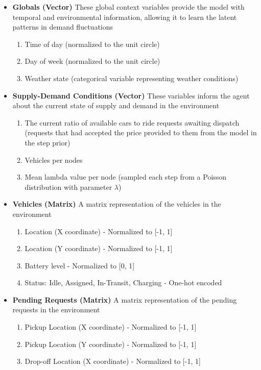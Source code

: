 \documentclass[11pt]{article}
\begin{document}
\begin{itemize}
		\item \textbf{Globals (Vector)} These global context variables provide the model with temporal and
				environmental information, allowing it to learn the latent patterns in demand fluctuations
				\begin{enumerate}
						\item Time of day (normalized to the unit circle)
						\item Day of week (normalized to the unit circle)
						\item Weather state (categorical variable representing weather conditions)
				\end{enumerate}
		\item \textbf{Supply-Demand Conditions (Vector)} These variables inform the agent about the current state
				of supply and demand in the environment
				\begin{enumerate}
						\item The current ratio of available cars to ride requests awaiting dispatch (requests that had
								accepted the price provided to them from the model in the step prior)
						\item Vehicles per nodes
						\item Mean lambda value per node (sampled each step from a Poisson distribution with parameter $\lambda$)
				\end{enumerate}
		\item \textbf{Vehicles (Matrix)} A matrix representation of the vehicles in the environment
				\begin{enumerate}
						\item Location (X coordinate) - Normalized to [-1, 1]
						\item Location (Y coordinate) - Normalized to [-1, 1]
						\item Battery level - Normalized to [0, 1]
						\item Status: {Idle, Assigned, In-Transit, Charging} - One-hot encoded
				\end{enumerate}
		\item \textbf{Pending Requests (Matrix)} A matrix representation of the pending requests in the environment
				\begin{enumerate}
						\item Pickup Location (X coordinate) - Normalized to [-1, 1]
						\item Pickup Location (Y coordinate) - Normalized to [-1, 1]
						\item Drop-off Location (X coordinate) - Normalized to [-1, 1]

\end{enumerate}
\end{itemize}
\end{document}
